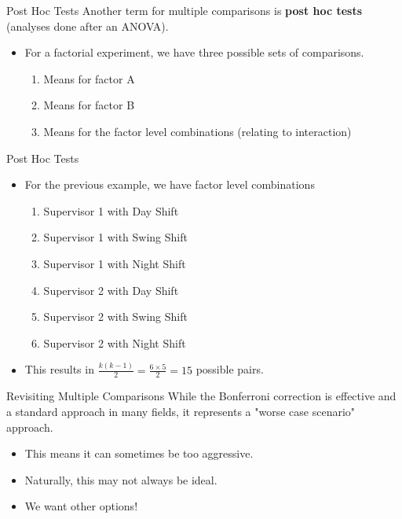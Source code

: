\begin{frame}{Post Hoc Tests}
    Another term for multiple comparisons is \textbf{post hoc tests} (analyses done after an ANOVA).
    \begin{itemize}
        \item For a factorial experiment, we have three possible sets of comparisons.
        \begin{enumerate}
            \item Means for factor A
            \item Means for factor B
            \item Means for the factor level combinations (relating to interaction)
        \end{enumerate}
    \end{itemize}
\end{frame}

\begin{frame}{Post Hoc Tests}
    \begin{itemize}
        \item For the previous example, we have factor level combinations
        \begin{enumerate}
            \item Supervisor 1 with Day Shift
            \item Supervisor 1 with Swing Shift
            \item Supervisor 1 with Night Shift
            \item Supervisor 2 with Day Shift
            \item Supervisor 2 with Swing Shift
            \item Supervisor 2 with Night Shift
        \end{enumerate}
        \item This results in $\frac{k(k-1)}{2}=\frac{6\times5}{2}=15$ possible pairs.
    \end{itemize}
\end{frame}

\begin{frame}{Revisiting Multiple Comparisons}
    While the Bonferroni correction is effective and a standard approach in many fields, it represents a "worse case scenario" approach.
    \begin{itemize}
        \item This means it can sometimes be too aggressive.
        \item Naturally, this may not always be ideal.
        \item We want other options!
    \end{itemize}
\end{frame}

